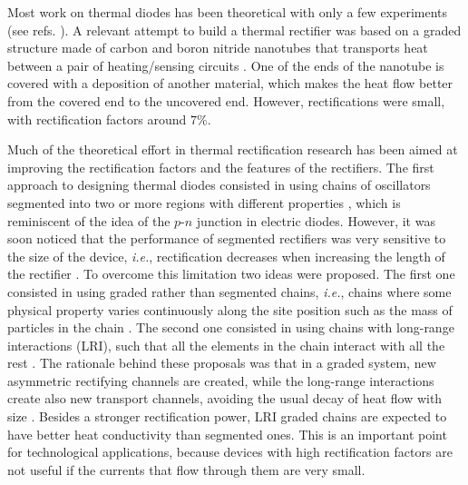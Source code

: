 Most work on thermal diodes has been theoretical with only a few experiments (see refs. \cite{Chang2006,Kobayashi2009,Leitner2013,Elzouka2017}).
A relevant attempt to build a thermal rectifier was based on a graded structure made of carbon and boron nitride nanotubes that transports heat between a pair of heating/sensing circuits \cite{Chang2006}. One of the ends of the nanotube is covered with a deposition of another material, which makes the heat flow better from the covered end to the uncovered end. However, rectifications were small, with rectification factors around $7\%$.

Much of the theoretical effort in thermal rectification research has been aimed at improving the rectification factors and the features of the rectifiers. The first approach to designing thermal diodes consisted in using chains of oscillators segmented into two or more regions with different properties \cite{Terraneo2002,Li2004,Li2008,Hu2006}, which is reminiscent of the idea of the $p$-$n$ junction in electric diodes. However, it was soon noticed that the performance of segmented rectifiers was very sensitive to the size of the device, \textit{i.e.}, rectification decreases when increasing the length of the rectifier \cite{Hu2006}. To overcome this limitation two ideas were proposed. The first one consisted in using graded rather than segmented chains, \textit{i.e.}, chains where some physical property varies continuously along the site position such as the mass of particles in the chain \cite{Wang2012,Chen2015,Romero-Bastida2017,Yang2007,Romero-Bastida2013,Dettori2016,Pereira2010,Pereira2011,Avila2013}. The second one consisted in using chains with long-range interactions (LRI), such that all the elements in the chain interact with all the rest \cite{Chen2015,Bagchi2017,Pereira2013}. The rationale behind these proposals was that in a graded system, new asymmetric rectifying channels are created, while the long-range interactions create
also new transport channels, avoiding the usual decay of heat flow with size \cite{Chen2015}. Besides a stronger rectification power, LRI graded chains are expected to have better heat conductivity than segmented ones. This is an important point for technological applications, because devices with high rectification factors are not useful if the currents that flow through them are very small.

